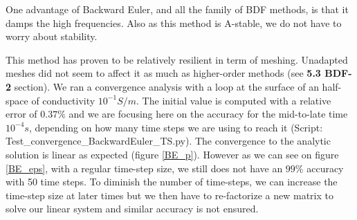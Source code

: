 \documentclass[twoside]{article}
\begin{document}
One advantage of Backward Euler, and all the family of BDF methods, is that it damps the high frequencies. Also as this method is A-stable, we do not have to worry about stability.

This method has proven to be relatively resilient in term of meshing. Unadapted meshes did not seem to affect it as much as higher-order methods (see \textbf{5.3 BDF-2} section). We ran a convergence analysis with a loop at the surface of an half-space of conductivity $10^{-1} S/m$. The initial value is computed with a relative error of $0.37\%$ and we are focusing here on the accuracy for the mid-to-late time $10^{-4}s$, depending on how many time steps we are using to reach it (Script: Test\_convergence\_BackwardEuler\_TS.py). The convergence to the analytic solution is linear as expected (figure \ref{BE_p}). However as we can see on figure \ref{BE_eps}, with a regular time-step size, we still does not have an $99\%$ accuracy with 50 time steps. To diminish the number of time-steps, we can increase the time-step size at later times but we then have to re-factorize a new matrix to solve our linear system and similar accuracy is not ensured.

\end{document}
